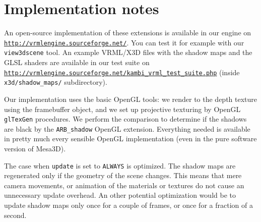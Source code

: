 \documentclass{acmsiggraph}                     %
\newenvironment{mycode}
{\begin{mycodecore}}
{\end{mycodecore}
\vspace{-0.1in}}
\newcommand*{\myhref}[2]{\texttt{\href{#1}{\nolinkurl{#2}}}}
\begin{document}



\section{Implementation notes}

An open-source implementation of these extensions is available in our engine on
\myhref{http://vrmlengine.sourceforge.net/}{http://vrmlengine.sourceforge.net/}.
You can test it for example with our \texttt{view3dscene} tool.
An example VRML/X3D files with the shadow maps and the GLSL shaders are available in our test suite
on \myhref{http://vrmlengine.sourceforge.net/kambi\_vrml\_test\_suite.php}{http://vrmlengine.sourceforge.net/kambi_vrml_test_suite.php}
(inside \texttt{x3d/shadow\_maps/} subdirectory).

Our implementation uses the basic OpenGL tools: we render to the depth
texture using the framebuffer object, and we set up projective texturing
by OpenGL \texttt{glTexGen} procedures.
We perform the comparison to determine if the shadows are black by the
\texttt{ARB\_shadow} OpenGL extension.
Everything needed is available in pretty much every sensible OpenGL
implementation (even in the pure software version of Mesa3D).

The case when \texttt{update} is set to \texttt{ALWAYS} is optimized.
The shadow maps are regenerated
only if the geometry of the scene changes. This means that mere camera
movements, or animation of the materials or textures do not cause
an unnecessary update overhead.
An other potential optimization would be to
update shadow maps only once for a couple of frames, or once for
a fraction of a second.
\end{document}

